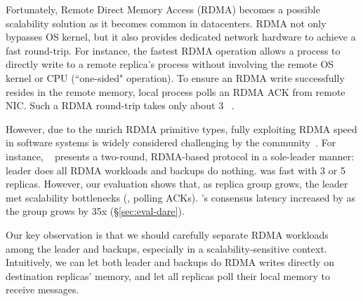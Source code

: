 Fortunately, Remote Direct Memory Access (RDMA) becomes a possible scalability 
solution as it becomes common in datacenters. RDMA not only bypasses OS 
kernel, but it also provides dedicated network hardware to achieve a fast 
round-trip. For instance, the fastest RDMA operation allows a process to 
directly write to a remote replica's process without involving the remote OS 
kernel or CPU (``one-sided" operation). To ensure an RDMA write successfully 
resides in the remote memory, local process polls an RDMA ACK from remote 
NIC. Such a RDMA round-trip takes only about 3 \us~\cite{pilaf:usenix14}.


However, due to the unrich RDMA primitive types, fully exploiting RDMA
speed in software systems is widely considered 
challenging by the community~\cite{pilaf:usenix14,herd:sigcomm14,
farm:sosp15,dare:hpdc15}. For instance, \dare~\cite{dare:hpdc15} presents a
two-round, RDMA-based \paxos protocol in a sole-leader manner: leader does all 
RDMA workloads and backups do nothing. \dare was fast with 3 or 5 
replicas. However, our evaluation shows that, as replica group grows, the 
leader met scalability bottlenecks (\eg, polling ACKs). \dare's consensus 
latency increased by \darescalability as the group grows by 35x
(\S\ref{sec:eval-dare}).



Our key observation is that we should carefully separate RDMA workloads among
the leader and backups, especially in a scalability-sensitive context. 
Intuitively, we can let both leader and backups do RDMA writes directly on 
destination replicas' memory, and let all replicas poll their local memory to 
receive messages.


